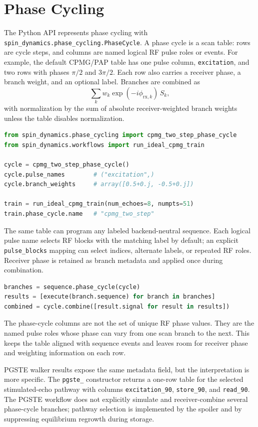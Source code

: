 \documentclass[11pt,oneside]{report}
\newcommand{\code}[1]{\texttt{#1}}
\begin{document}
\section{Phase Cycling}

The Python API represents phase cycling with
\code{spin\_dynamics.phase\_cycling.PhaseCycle}. A phase cycle is a scan table:
rows are cycle steps, and columns are named logical RF pulse roles or events.
For example, the default CPMG/PAP table has one pulse column,
\code{excitation}, and two rows with phases \(\pi/2\) and \(3\pi/2\). Each row
also carries a receiver phase, a branch weight, and an optional label. Branches
are combined as
\[
  \sum_k w_k \exp(-i\phi_{\mathrm{rx},k})\,S_k,
\]
with normalization by the sum of absolute receiver-weighted branch weights
unless the table disables normalization.

\begin{lstlisting}[language=Python]
from spin_dynamics.phase_cycling import cpmg_two_step_phase_cycle
from spin_dynamics.workflows import run_ideal_cpmg_train

cycle = cpmg_two_step_phase_cycle()
cycle.pulse_names        # ("excitation",)
cycle.branch_weights     # array([0.5+0.j, -0.5+0.j])

train = run_ideal_cpmg_train(num_echoes=8, numpts=51)
train.phase_cycle.name   # "cpmg_two_step"
\end{lstlisting}

The same table can program any labeled backend-neutral sequence. Each logical
pulse name selects RF blocks with the matching label by default; an explicit
\code{pulse\_blocks} mapping can select indices, alternate labels, or repeated
RF roles. Receiver phase is retained as branch metadata and applied once during
combination.

\begin{lstlisting}[language=Python]
branches = sequence.phase_cycle(cycle)
results = [execute(branch.sequence) for branch in branches]
combined = cycle.combine([result.signal for result in results])
\end{lstlisting}

The phase-cycle columns are not the set of unique RF phase values. They are the
named pulse roles whose phase can vary from one scan branch to the next. This
keeps the table aligned with sequence events and leaves room for receiver phase
and weighting information on each row.

PGSTE walker results expose the same metadata field, but the interpretation is
more specific. The \code{pgste\_} constructor returns a one-row table for the
selected stimulated-echo pathway with columns \code{excitation\_90},
\code{store\_90}, and \code{read\_90}. The PGSTE workflow does not explicitly
simulate and receiver-combine several phase-cycle branches; pathway selection is
implemented by the spoiler and by suppressing equilibrium regrowth during
storage.
\end{document}
